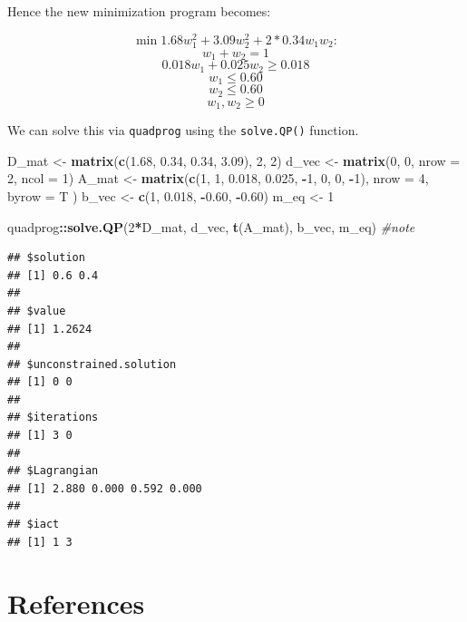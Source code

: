 \documentclass[11pt,]{article}
\newenvironment{Shaded}{\begin{snugshade}}{\end{snugshade}}
\newcommand{\KeywordTok}[1]{\textcolor[rgb]{0.13,0.29,0.53}{\textbf{#1}}}
\newcommand{\DataTypeTok}[1]{\textcolor[rgb]{0.13,0.29,0.53}{#1}}
\newcommand{\DecValTok}[1]{\textcolor[rgb]{0.00,0.00,0.81}{#1}}
\newcommand{\FloatTok}[1]{\textcolor[rgb]{0.00,0.00,0.81}{#1}}
\newcommand{\StringTok}[1]{\textcolor[rgb]{0.31,0.60,0.02}{#1}}
\newcommand{\CommentTok}[1]{\textcolor[rgb]{0.56,0.35,0.01}{\textit{#1}}}
\newcommand{\OperatorTok}[1]{\textcolor[rgb]{0.81,0.36,0.00}{\textbf{#1}}}
\newcommand{\NormalTok}[1]{#1}
\begin{document}
Hence the new minimization program becomes:

\[\min{} 1.68w_1^2+3.09w_2^2+2*0.34w_1w_2:\] \[w_1+w_2=1\]
\[0.018w_1 + 0.025w_2 \geq 0.018\] \[w_1\leq 0.60\] \[w_2\leq 0.60\]
\[w_1, w_2\geq 0\]

We can solve this via \texttt{quadprog} using the \texttt{solve.QP()}
function.

\begin{Shaded}
\begin{Highlighting}[]
\NormalTok{D_mat <-}\StringTok{ }\KeywordTok{matrix}\NormalTok{(}\KeywordTok{c}\NormalTok{(}\FloatTok{1.68}\NormalTok{, }\FloatTok{0.34}\NormalTok{, }\FloatTok{0.34}\NormalTok{, }\FloatTok{3.09}\NormalTok{), }\DecValTok{2}\NormalTok{, }\DecValTok{2}\NormalTok{) }
\NormalTok{d_vec <-}\StringTok{ }\KeywordTok{matrix}\NormalTok{(}\DecValTok{0}\NormalTok{, }\DecValTok{0}\NormalTok{, }\DataTypeTok{nrow =} \DecValTok{2}\NormalTok{, }\DataTypeTok{ncol =} \DecValTok{1}\NormalTok{)}
\NormalTok{A_mat <-}\StringTok{ }\KeywordTok{matrix}\NormalTok{(}\KeywordTok{c}\NormalTok{(}\DecValTok{1}\NormalTok{, }\DecValTok{1}\NormalTok{, }\FloatTok{0.018}\NormalTok{, }\FloatTok{0.025}\NormalTok{, }\OperatorTok{-}\DecValTok{1}\NormalTok{, }\DecValTok{0}\NormalTok{, }\DecValTok{0}\NormalTok{, }\OperatorTok{-}\DecValTok{1}\NormalTok{), }
                \DataTypeTok{nrow =} \DecValTok{4}\NormalTok{, }
                \DataTypeTok{byrow =}\NormalTok{ T}
\NormalTok{                )}
\NormalTok{b_vec <-}\StringTok{ }\KeywordTok{c}\NormalTok{(}\DecValTok{1}\NormalTok{, }\FloatTok{0.018}\NormalTok{, }\OperatorTok{-}\FloatTok{0.60}\NormalTok{, }\OperatorTok{-}\FloatTok{0.60}\NormalTok{)}
\NormalTok{m_eq <-}\StringTok{ }\DecValTok{1}

\NormalTok{quadprog}\OperatorTok{::}\KeywordTok{solve.QP}\NormalTok{(}\DecValTok{2}\OperatorTok{*}\NormalTok{D_mat, d_vec, }\KeywordTok{t}\NormalTok{(A_mat), b_vec, m_eq) }\CommentTok{#note}
\end{Highlighting}
\end{Shaded}

\begin{verbatim}
## $solution
## [1] 0.6 0.4
## 
## $value
## [1] 1.2624
## 
## $unconstrained.solution
## [1] 0 0
## 
## $iterations
## [1] 3 0
## 
## $Lagrangian
## [1] 2.880 0.000 0.592 0.000
## 
## $iact
## [1] 1 3
\end{verbatim}

\section*{References}\label{references}
\end{document}

